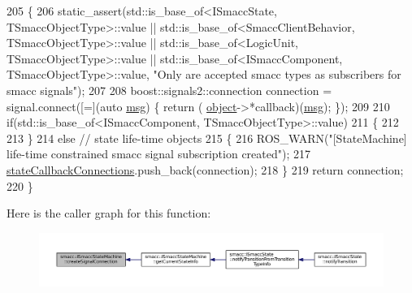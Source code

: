 \begin{DoxyCode}
205 \{
206     static\_assert(std::is\_base\_of<ISmaccState, TSmaccObjectType>::value || 
      std::is\_base\_of<SmaccClientBehavior, TSmaccObjectType>::value || std::is\_base\_of<LogicUnit, TSmaccObjectType>::value || 
      std::is\_base\_of<ISmaccComponent, TSmaccObjectType>::value, \textcolor{stringliteral}{"Only are accepted smacc types as subscribers for smacc signals"});
207 
208     boost::signals2::connection connection = signal.connect([=](\textcolor{keyword}{auto} \hyperlink{namespacekeyboard__node_a768777e12f75b89e4a0a60acf748e9eb}{msg}) \{ \textcolor{keywordflow}{return} (
      \hyperlink{classobject}{object}->*callback)(\hyperlink{namespacekeyboard__node_a768777e12f75b89e4a0a60acf748e9eb}{msg}); \});
209 
210     \textcolor{keywordflow}{if}(std::is\_base\_of<ISmaccComponent, TSmaccObjectType>::value)
211     \{
212 
213     \}
214     \textcolor{keywordflow}{else} \textcolor{comment}{// state life-time objects}
215     \{
216         ROS\_WARN(\textcolor{stringliteral}{"[StateMachine] life-time constrained smacc signal subscription created"});
217         \hyperlink{classsmacc_1_1ISmaccStateMachine_aaf98bb0edaa5d8c84767e4acfad3548d}{stateCallbackConnections}.push\_back(connection);
218     \}
219     \textcolor{keywordflow}{return} connection;
220 \}
\end{DoxyCode}


Here is the caller graph for this function\+:
\nopagebreak
\begin{figure}[H]
\begin{center}
\leavevmode
\includegraphics[width=350pt]{classsmacc_1_1ISmaccStateMachine_adf0f42ade0c65cc471960fe2a7c42da2_icgraph}
\end{center}
\end{figure}


